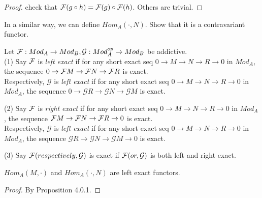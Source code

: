 \documentclass[11pt,fleqn]{book} %
\begin{document}
\begin{CJK}{UTF8}{gkai}
\begin{proof}
	check that $\mathcal{F}(g\circ h) = \mathcal{F}(g)\circ \mathcal{F}(h)$. Others are trivial.
\end{proof}

\begin{example}
	In a similar way, we can define $Hom_A(\cdot,N)$. Show that it is a contravariant functor.
\end{example}

\newcommand{\mcg}{\mathcal{G}}
\begin{definition}
	 Let $\mcf:Mod_A \to Mod_B, \mcg:Mod_A^{op}\to Mod_B$ be addictive. \\
	(1) Say $\mathcal{F}$ is {\it left exact} if for any short exact seq $0\to M\to N\to R \to 0$ in $Mod_A$, the sequence $0\to \mathcal{F} M\to \mathcal{F} N \to \mathcal{F} R$ is exact. \\
		Respectively, $\mcg$ is {\it left exact} if for any short exact seq $0\to M\to N\to R \to 0$ in $Mod_A$, the sequence $0\to \mcg R\to \mcg N \to \mcg M$ is exact.
	
	(2) Say $\mathcal{F}$ is {\it right exact} if for any short exact seq $0\to M\to N\to R \to 0$ in $Mod_A$, the sequence $\mathcal{F} M\to \mathcal{F} N \to \mathcal{F} R\to 0$ is exact. \\
	Respectively, $\mcg$ is {\it left exact} if for any short exact seq $0\to M\to N\to R \to 0$ in $Mod_A$, the sequence $\mcg R\to \mcg N \to \mcg M\to 0$ is exact.

	(3) Say $\mcf (respectively, \mcg)$ is exact if $\mcf (or, \mcg)$ is both left and right exact. 
\end{definition}

\begin{proposition}
	$Hom_A(M,\cdot)$ and $Hom_A(\cdot, N)$ are left exact functors.	
\end{proposition}
\begin{proof}
	By Proposition 4.0.1.
\end{proof}

\
\end{CJK}
\end{document}
